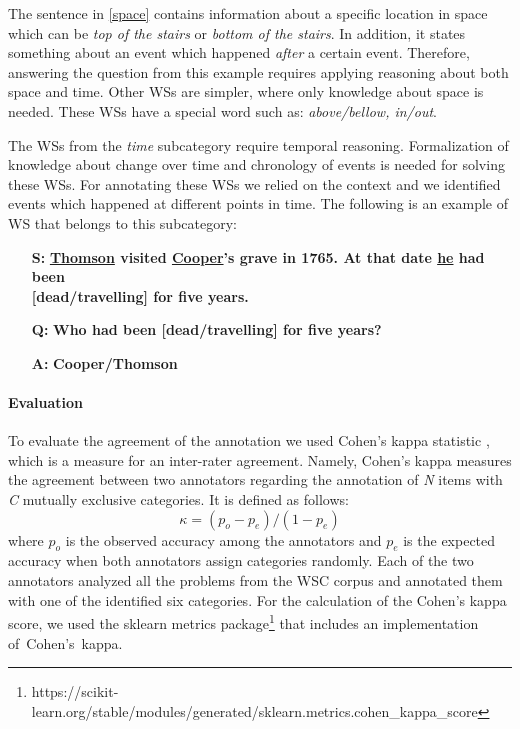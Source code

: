 The sentence in \ref{space} contains information about a specific location in space which can be \textit{top of the stairs} or \textit{bottom of the stairs}. In addition, it states something about an event which happened \textit{after} a certain event. Therefore, answering the question from this example requires applying reasoning about both space and time. Other WSs are simpler, where only knowledge about space is needed. These WSs have a special word such as: \textit{above/bellow, in/out}.

The WSs from the \textit{time} subcategory require temporal reasoning. 
Formalization of knowledge about change over time and chronology of events is needed for solving these WSs. For annotating these WSs we relied on the context and we identified events which happened at different points in time. The following is an example of WS that belongs to this subcategory:

\begin{itemize} \label{Ex2}
	\item[\textbf{S:}] \textbf{\underline{Thomson} visited \underline{Cooper}'s grave in 1765. At that date \underline{he} had been} \\ \textbf{[dead/travelling] for five years.}
	\item[\textbf{Q:}] \textbf{ Who had been [dead/travelling] for five years? }
	\item[\textbf{A:}] \textbf{Cooper/Thomson}
\end{itemize}



\paragraph{Evaluation}
To evaluate the agreement of the annotation 
we used Cohen's kappa statistic \cite{doi:10.1177/001316446002000104}, which is a measure for an inter-rater agreement. Namely, Cohen's kappa measures the agreement between two annotators regarding the annotation of \textit{N} items with \textit{C} mutually exclusive categories. 
It is defined as follows: 
\begin{equation}
	\kappa = (p_o-p_e)/(1-p_e)
\end{equation}
where $p_o$ is the observed accuracy among the annotators and $p_e$ is the expected accuracy when both annotators assign categories randomly. Each of the two annotators analyzed all the problems from the WSC corpus and annotated them with one of the identified six categories. For the calculation of the Cohen's kappa score, we used the sklearn metrics  package\footnote{https://scikit-learn.org/stable/modules/generated/sklearn.metrics.cohen\_kappa\_score} that includes an implementation of~Cohen's~kappa.

